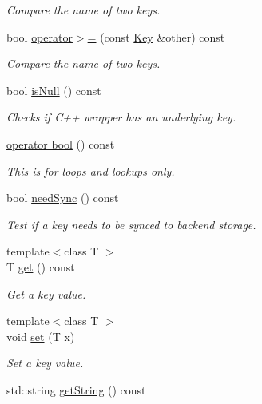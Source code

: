 \begin{DoxyCompactItemize}
\begin{DoxyCompactList}\small\item\em Compare the name of two keys. \end{DoxyCompactList}\item 
bool \hyperlink{classkdb_1_1Key_a4e711165a33a127d95f7102307e94bf6}{operator$>$=} (const \hyperlink{classkdb_1_1Key}{Key} \&other) const
\begin{DoxyCompactList}\small\item\em Compare the name of two keys. \end{DoxyCompactList}\item 
bool \hyperlink{classkdb_1_1Key_ab70b89caae5fe1e9a2e774733576fa4c}{is\+Null} () const
\begin{DoxyCompactList}\small\item\em Checks if C++ wrapper has an underlying key. \end{DoxyCompactList}\item 
\hyperlink{classkdb_1_1Key_a15ee99e8447ee526d600e15938e4a1c0}{operator bool} () const
\begin{DoxyCompactList}\small\item\em This is for loops and lookups only. \end{DoxyCompactList}\item 
bool \hyperlink{classkdb_1_1Key_add635e6194c7a05b7d4e470f7b135d9c}{need\+Sync} () const
\begin{DoxyCompactList}\small\item\em Test if a key needs to be synced to backend storage. \end{DoxyCompactList}\item 
{\footnotesize template$<$class T $>$ }\\T \hyperlink{classkdb_1_1Key_ac558a1f1b2cb50d77fbabcbb24950c05}{get} () const
\begin{DoxyCompactList}\small\item\em Get a key value. \end{DoxyCompactList}\item 
{\footnotesize template$<$class T $>$ }\\void \hyperlink{classkdb_1_1Key_a615124f0a2b291e03975b49c233654d7}{set} (T x)
\begin{DoxyCompactList}\small\item\em Set a key value. \end{DoxyCompactList}\item 
std\+::string \hyperlink{classkdb_1_1Key_af612ede3a73e57b317a65e40e7f9e01b}{get\+String} () const

\end{DoxyCompactItemize}

